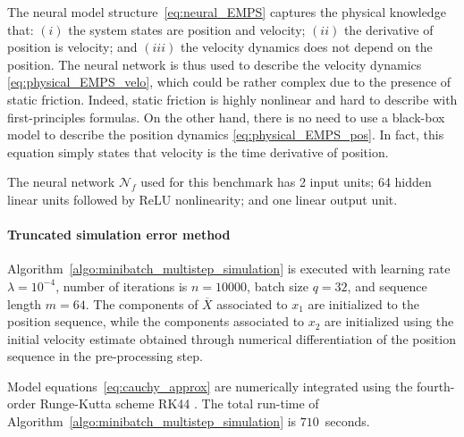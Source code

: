 \documentclass{article} %
\newcommand{\NN}{\mathcal{N}} %
\newcommand{\batchsize}{q}
\newcommand{\seqlen}{m}
\newcommand{\numiter}{n}
\newcommand{\hidden}[1]{\overline{#1}}
\begin{document}
The neural model structure~\eqref{eq:neural_EMPS}  
captures the physical knowledge that: $(i)$ the system states are position and velocity; $(ii)$ 
the derivative of position is velocity; and $(iii)$ the velocity dynamics does not depend on the position. The neural network is thus used to describe the velocity dynamics \eqref{eq:physical_EMPS_velo}, which could be rather complex due to the presence of static friction. Indeed, static friction is highly nonlinear and hard to describe with first-principles formulas. On the other hand, there is no need to use a black-box model to describe the position dynamics \eqref{eq:physical_EMPS_pos}. In fact, this equation simply states that velocity is the time derivative of position.%

The neural network $\NN_{\!f}$ used for this benchmark has 2 input units; 64 hidden linear units followed by ReLU nonlinearity; and one linear output unit.
\paragraph{Truncated simulation error method}
Algorithm~\ref{algo:minibatch_multistep_simulation} is executed with learning rate $\lambda=10^{-4}$, number of iterations is $\numiter=10000$,   batch size $\batchsize=32$, and sequence length $\seqlen=64$. 
{The components of $\hidden{X}$ associated to $x_1$ are initialized to the position sequence, while the components associated to $x_2$ are initialized using the initial velocity estimate obtained through numerical differentiation of the position sequence in the pre-processing step.}

Model equations~\eqref{eq:cauchy_approx} are numerically integrated using  the  fourth-order Runge-Kutta scheme RK44 \citep{ralston1962runge}. The total run-time of Algorithm~\ref{algo:minibatch_multistep_simulation} is $710$~seconds.
\end{document}

